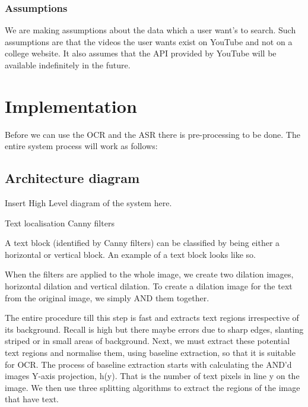 \documentclass[a4paper,12pt]{article}
\begin{document}
\subsubsection{Assumptions}
We are making assumptions about the data which a user want's to search. Such assumptions are that the videos the user wants exist on YouTube and not on a college website. It also assumes that the API provided by YouTube will be available indefinitely in the future.

\section{Implementation}
Before we can use the OCR and the ASR there is pre-processing to be done. The entire system process will work as follows:

\subsection{Architecture diagram}
Insert High Level diagram of the system here.

Text localisation
Canny filters

A text block (identified by Canny filters) can be classified by being either a horizontal or vertical block. An example of a text block looks like so.

When the filters are applied to the whole image, we create two dilation images, horizontal dilation and vertical dilation. To create a dilation image for the text from the original image, we simply AND them together.

The entire procedure till this step is fast and extracts text regions irrespective of its background. Recall is high but there maybe errors due to sharp edges, slanting striped or in small areas of background. Next, we must extract these potential text regions and normalise them, using baseline extraction, so that it is suitable for OCR. The process of baseline extraction starts with calculating the AND’d images Y-axis projection, h(y). That is the number of text pixels in line y on the image. We then use three splitting algorithms to extract the regions of the image that have text.
\end{document}
